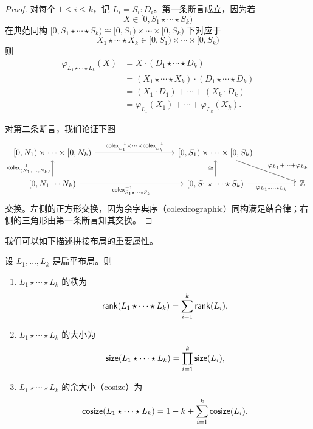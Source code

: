 \begin{proof}
    对每个 $1 \leq i \leq k$，记 $L_i = S_i:D_i$。第一条断言成立，因为若
    \[X \in [0,S_1 \star \cdots \star S_k)\]
    在典范同构 $[0,S_1 \star \cdots \star S_k) \cong [0,S_1) \times \cdots \times [0,S_k)$ 下对应于
    \[
    X_1 \star \cdots \star X_k \in [0,S_1) \times \cdots \times [0,S_k)
    \]
    则
    \begin{align*}
        \varphi_{L_1 \star \cdots \star L_k}(X) & = X \cdot (D_1 \star \cdots \star D_k)\\
        & = (X_1 \star \cdots \star X_k) \cdot (D_1 \star \cdots \star D_k)\\
        & = (X_1 \cdot D_1) + \cdots + (X_k \cdot D_k)\\
        & = \varphi_{L_1}(X_1) + \cdots + \varphi_{L_k}(X_k).
    \end{align*}

    对第二条断言，我们论证下图
    \[\begin{tikzcd} [row sep = 20]
    {[}0,N_1 {)} \times \cdots \times {[}0,N_k {)} \ar[rrrr,"\colex_{S_1}^{-1} \times \cdots \times \colex_{S_k}^{-1} "] & & & & {[}0,S_1 {)} \times \cdots \times {[}0,S_k {)} \ar[drr,"\varphi_{L_1} + \cdots + \varphi_{L_k}"] & & \\
    {[}0,N_1 \cdots N_k {)} \ar[u,"\colex_{(N_1,\dots,N_k)}^{-1}"] \ar[rrrr,swap,"\colex_{S_1\star \cdots \star S_k}^{-1}"] & & & & {[}0,S_1 \star \cdots \star S_k{)} \ar[rr,swap,"\varphi_{L_1 \star \cdots \star L_k}"] \ar[u,"\cong"] & & \mathbb{Z}
    \end{tikzcd} \]
    交换。左侧的正方形交换，因为余字典序（colexicographic）同构满足结合律；右侧的三角形由第一条断言知其交换。
\end{proof}

我们可以如下描述拼接布局的重要属性。

\begin{proposition}\label{attributesofconcatenatedflatlayouts}
    设 $L_1,\dots,L_k$ 是扁平布局。则
    \begin{enumerate}
        \item $L_1 \star \cdots \star L_k$ 的秩为 \[\mathsf{rank}(L_1 \star \cdots \star L_k)  = \sum_{i=1}^k\mathsf{rank}(L_i),\]
        \item $L_1 \star \cdots \star L_k$ 的大小为
        \[\mathsf{size}(L_1 \star \cdots \star L_k) = \prod_{i=1}^k\mathsf{size}(L_i),\]
        \item $L_1 \star \cdots \star L_k$ 的余大小（cosize）为
        \[\mathsf{cosize}(L_1 \star \cdots \star L_k) = 1 - k + \sum_{i=1}^k\mathsf{cosize}(L_i).\]
    \end{enumerate}
\end{proposition}

